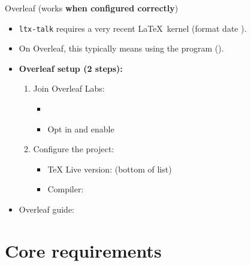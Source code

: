 \begin{frame}{Overleaf (works \textbf{when configured correctly})}
\begin{itemize}
\item \texttt{ltx-talk} requires a very recent \LaTeX\ kernel (format date ).
\item On Overleaf, this typically means using the  program ().

\bigskip

\item \textbf{Overleaf setup (2 steps):}
  \begin{enumerate}
  \item Join Overleaf Labs:
    \begin{itemize}
    \item {}
    \item Opt in and enable 
    \end{itemize}
  \item Configure the project:
    \begin{itemize}
    \item TeX Live version:  (bottom of list)
    \item Compiler: 
    \end{itemize}
  \end{enumerate}

\bigskip

\item Overleaf guide: 
\end{itemize}
\end{frame}

\section{Core requirements}

